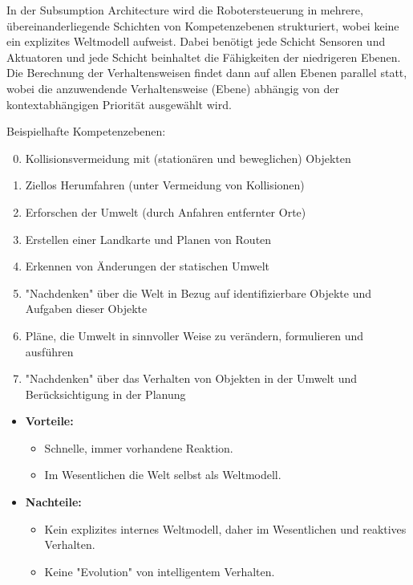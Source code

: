 			In der Subsumption Architecture wird die Robotersteuerung in mehrere, übereinanderliegende Schichten von Kompetenzebenen strukturiert, wobei keine ein explizites Weltmodell aufweist. Dabei benötigt jede Schicht Sensoren und Aktuatoren und jede Schicht beinhaltet die Fähigkeiten der niedrigeren Ebenen. Die Berechnung der Verhaltensweisen findet dann auf allen Ebenen parallel statt, wobei die anzuwendende Verhaltensweise (\bzw Ebene) abhängig von der kontextabhängigen Priorität ausgewählt wird.

			Beispielhafte Kompetenzebenen:
			\begin{enumerate}
				\setcounter{enumi}{-1}
				\item Kollisionsvermeidung mit (stationären und beweglichen) Objekten
				\item Ziellos Herumfahren (unter Vermeidung von Kollisionen)
				\item Erforschen der Umwelt (durch Anfahren entfernter Orte)
				\item Erstellen einer Landkarte und Planen von Routen
				\item Erkennen von Änderungen der statischen Umwelt
				\item "Nachdenken" über die Welt in Bezug auf identifizierbare Objekte und Aufgaben \bzgl dieser Objekte
				\item Pläne, die Umwelt in sinnvoller Weise zu verändern, formulieren und ausführen
				\item "Nachdenken" über das Verhalten von Objekten in der Umwelt und Berücksichtigung in der Planung
			\end{enumerate}

			\begin{itemize}
				\item \textbf{Vorteile:}
					\begin{itemize}
						\item Schnelle, immer vorhandene Reaktion.
						\item Im Wesentlichen die Welt selbst als Weltmodell.
					\end{itemize}
				\item \textbf{Nachteile:}
					\begin{itemize}
						\item Kein explizites internes Weltmodell, daher im Wesentlichen und reaktives Verhalten.
						\item Keine "Evolution" von intelligentem Verhalten.
					\end{itemize}
			\end{itemize}

